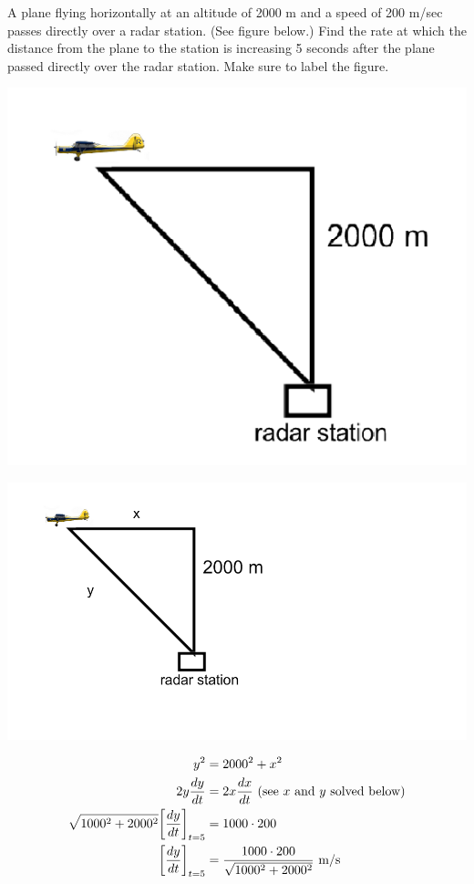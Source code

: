 \documentclass[nooutcomes,handout]{ximera}
\begin{document}
\begin{problem}
A plane flying horizontally at an altitude of 2000 m and a speed of 200 m/sec passes directly over a radar station.  (See figure below.)  Find the rate at which the distance from the plane to the station is increasing 5 seconds after the plane passed directly over the radar station.  Make sure to label the figure.

	\begin{image}
	\includegraphics[scale=.5]{Figure4.png}
	\end{image}
\begin{freeResponse} \hfil

	\begin{image}
	\includegraphics[scale=.5]{Figure5.png}
	\end{image}

	\begin{align*}
	y^2&=2000^2+x^2\\
	2y{\frac{dy}{dt}}&=2x{\frac{dx}{dt}}\ \text{(see $x$ and $y$ solved below)}\\
	\sqrt{1000^2+2000^2}\bigg[ {\frac{dy}{dt}} \bigg]_{t=5}&=1000 \cdot 200 \\
	\bigg[ {\frac{dy}{dt}} \bigg]_{t=5}&=\frac{1000 \cdot 200}{\sqrt{1000^2+2000^2}}\ \text{m/s}
	\end{align*}


\end{freeResponse}
\end{problem}
\end{document}
